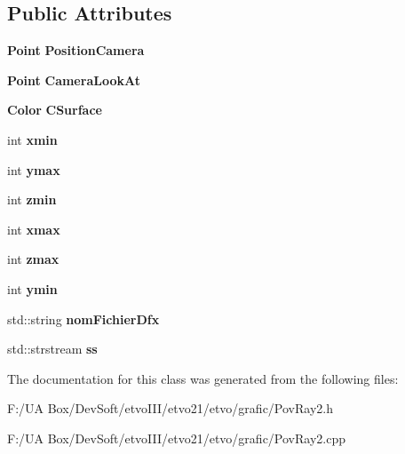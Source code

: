 \subsection*{Public Attributes}
\begin{DoxyCompactItemize}
\item 
\mbox{\label{class_pov_ray_1_1_pov_ray2_abba09dc6793e4ac70e75b30f5b9b5082}} 
\textbf{ Point} {\bfseries Position\+Camera}
\item 
\mbox{\label{class_pov_ray_1_1_pov_ray2_a219dab2e4a54b7ff61727246837458fa}} 
\textbf{ Point} {\bfseries Camera\+Look\+At}
\item 
\mbox{\label{class_pov_ray_1_1_pov_ray2_ab8c81f8038e987667f05ebfea64d29b9}} 
\textbf{ Color} {\bfseries C\+Surface}
\item 
\mbox{\label{class_pov_ray_1_1_pov_ray2_aac21b14144097da2b288dd35ffca5885}} 
int {\bfseries xmin}
\item 
\mbox{\label{class_pov_ray_1_1_pov_ray2_a2a7b42fbe8d38ecc0b4071205e0c5e20}} 
int {\bfseries ymax}
\item 
\mbox{\label{class_pov_ray_1_1_pov_ray2_aa5ad3e488bc8153cc45ba918409dbf96}} 
int {\bfseries zmin}
\item 
\mbox{\label{class_pov_ray_1_1_pov_ray2_a342e45e1769ece5a245fd647c77060ce}} 
int {\bfseries xmax}
\item 
\mbox{\label{class_pov_ray_1_1_pov_ray2_a715ef2f3a63a842780f08c3bafe275dc}} 
int {\bfseries zmax}
\item 
\mbox{\label{class_pov_ray_1_1_pov_ray2_a5132ba86a9dccd58f6965a19b2491ffc}} 
int {\bfseries ymin}
\item 
\mbox{\label{class_pov_ray_1_1_pov_ray2_a9a1db6d7b3ac0907ce91a73958458d4f}} 
std\+::string {\bfseries nom\+Fichier\+Dfx}
\item 
\mbox{\label{class_pov_ray_1_1_pov_ray2_a262172e2cbfcaeff82b88d054673e9d6}} 
std\+::strstream {\bfseries ss}
\end{DoxyCompactItemize}


The documentation for this class was generated from the following files\+:\begin{DoxyCompactItemize}
\item 
F\+:/\+U\+A Box/\+Dev\+Soft/etvo\+I\+I\+I/etvo21/etvo/grafic/Pov\+Ray2.\+h\item 
F\+:/\+U\+A Box/\+Dev\+Soft/etvo\+I\+I\+I/etvo21/etvo/grafic/Pov\+Ray2.\+cpp\end{DoxyCompactItemize}
